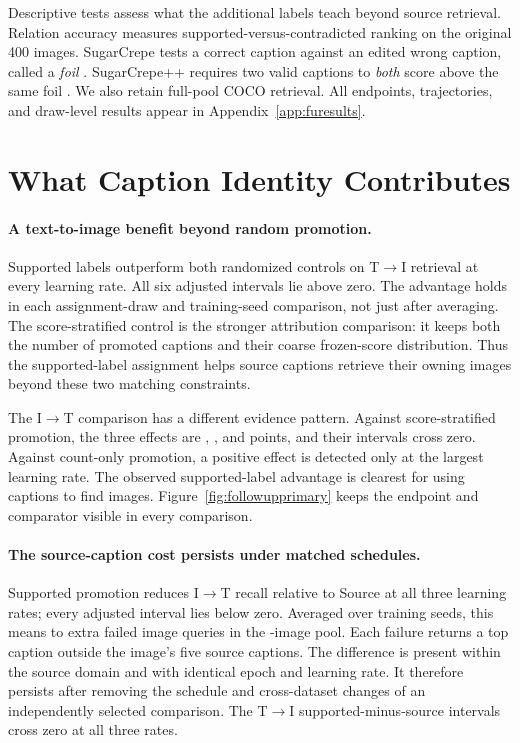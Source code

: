 \documentclass[11pt]{article}
\begin{document}
Descriptive tests assess what the additional labels teach beyond source retrieval. Relation accuracy measures supported-versus-contradicted ranking on the original 400 images. SugarCrepe tests a correct caption against an edited wrong caption, called a \emph{foil} \citep{hsieh2023sugarcrepe}. SugarCrepe++ requires two valid captions to \emph{both} score above the same foil \citep{dumpala2024sugarcrepepp}. We also retain full-pool COCO retrieval. All endpoints, trajectories, and draw-level results appear in Appendix~\ref{app:furesults}.



\section{What Caption Identity Contributes}
\label{sec:results}
\paragraph{A text-to-image benefit beyond random promotion.}
Supported labels outperform both randomized controls on T$\to$I retrieval at every learning rate. All six adjusted intervals lie above zero. The advantage holds in each assignment-draw and training-seed comparison, not just after averaging. The score-stratified control is the stronger attribution comparison: it keeps both the number of promoted captions and their coarse frozen-score distribution. Thus the supported-label assignment helps source captions retrieve their owning images beyond these two matching constraints.

The I$\to$T comparison has a different evidence pattern. Against score-stratified promotion, the three effects are \FuStrataImageEffectOne{}, \FuStrataImageEffectTwo{}, and \FuStrataImageEffectThree{} points, and their intervals cross zero. Against count-only promotion, a positive effect is detected only at the largest learning rate. The observed supported-label advantage is clearest for using captions to find images. Figure~\ref{fig:followupprimary} keeps the endpoint and comparator visible in every comparison.

\paragraph{The source-caption cost persists under matched schedules.}
Supported promotion reduces I$\to$T recall relative to Source at all three learning rates; every adjusted interval lies below zero. Averaged over training seeds, this means \FuAdditionalFailuresLow{} to \FuAdditionalFailuresHigh{} extra failed image queries in the \FuTestImages{}-image pool. Each failure returns a top caption outside the image's five source captions. The difference is present within the source domain and with identical epoch and learning rate. It therefore persists after removing the schedule and cross-dataset changes of an independently selected comparison. The T$\to$I supported-minus-source intervals cross zero at all three rates.
\end{document}
